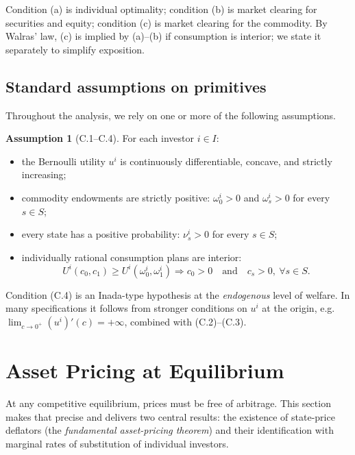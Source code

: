 \documentclass[11pt,a4paper,oneside]{book}
\def\geq{\geqslant}
\def\et{\quad \text{and} \quad}
\theoremstyle{plain}
\theoremstyle{definition}
\newtheorem{assumption}[theorem]{Assumption}
\theoremstyle{remark}
\numberwithin{equation}{chapter}
\begin{document}
Condition (a) is individual optimality; condition (b) is market clearing for securities and equity; condition (c) is market clearing for the commodity.
By Walras' law, (c) is implied by (a)--(b) if consumption is interior; we state it separately to simplify exposition.

\subsection{Standard assumptions on primitives}

Throughout the analysis, we rely on one or more of the following assumptions.

\begin{assumption}[C.1--C.4]\label{ass:C}
For each investor $i \in I$:
\begin{itemize}
  \item[\textup{(C.1)}] the Bernoulli utility $u^i$ is continuously differentiable, concave, and strictly increasing;
  \item[\textup{(C.2)}] commodity endowments are strictly positive: $\omega^i_0 > 0$ and $\omega^i_s > 0$ for every $s \in S$;
  \item[\textup{(C.3)}] every state has a positive probability: $\nu^i_s > 0$ for every $s \in S$;
  \item[\textup{(C.4)}] individually rational consumption plans are interior:
  \begin{equation*}
    U^i(c_0, c_1) \geq U^i(\omega^i_0, \omega^i_1)
    \Longrightarrow
    c_0 > 0 \et c_s > 0, \ \forall s \in S.
  \end{equation*}
\end{itemize}
\end{assumption}

Condition (C.4) is an Inada-type hypothesis at the \emph{endogenous} level of welfare.
In many specifications it follows from stronger conditions on $u^i$ at the origin, e.g.\ $\lim_{c \to 0^+} (u^i)'(c) = +\infty$, combined with (C.2)--(C.3).

\section{Asset Pricing at Equilibrium}
\label{sec:asset-pricing}

At any competitive equilibrium, prices must be free of arbitrage.
This section makes that precise and delivers two central results: the existence of state-price deflators (the \emph{fundamental asset-pricing theorem}) and their identification with marginal rates of substitution of individual investors.
\end{document}
